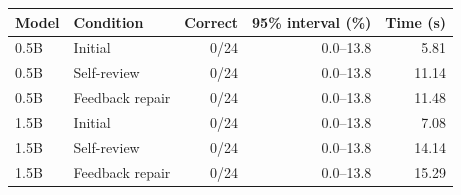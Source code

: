 \begin{tabular}{llrrr}
\toprule
Model & Condition & Correct & 95\% interval (\%) & Time (s) \\
\midrule
0.5B & Initial & 0/24 & 0.0--13.8 & 5.81 \\
0.5B & Self-review & 0/24 & 0.0--13.8 & 11.14 \\
0.5B & Feedback repair & 0/24 & 0.0--13.8 & 11.48 \\
1.5B & Initial & 0/24 & 0.0--13.8 & 7.08 \\
1.5B & Self-review & 0/24 & 0.0--13.8 & 14.14 \\
1.5B & Feedback repair & 0/24 & 0.0--13.8 & 15.29 \\
\bottomrule
\end{tabular}
